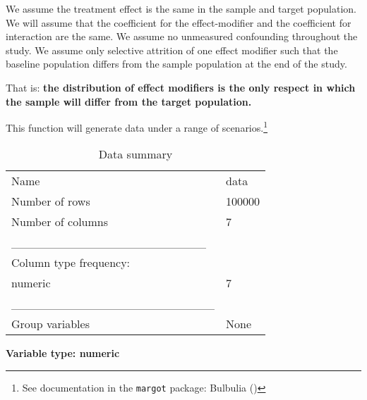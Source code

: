 \documentclass[
  single column]{article}
\begin{document}
We assume the treatment effect is the same in the sample and target
population. We will assume that the coefficient for the effect-modifier
and the coefficient for interaction are the same. We assume no
unmeasured confounding throughout the study. We assume only selective
attrition of one effect modifier such that the baseline population
differs from the sample population at the end of the study.

That is: \textbf{the distribution of effect modifiers is the only
respect in which the sample will differ from the target population.}

This function will generate data under a range of scenarios.\footnote{See
  documentation in the \texttt{margot} package: Bulbulia
  ()}

\begin{longtable}[]{@{}ll@{}}
\caption{Data summary}\tabularnewline
\toprule\noalign{}
\endfirsthead
\endhead
\bottomrule\noalign{}
\endlastfoot
Name & data \\
Number of rows & 100000 \\
Number of columns & 7 \\
\_\_\_\_\_\_\_\_\_\_\_\_\_\_\_\_\_\_\_\_\_\_\_ & \\
Column type frequency: & \\
numeric & 7 \\
\_\_\_\_\_\_\_\_\_\_\_\_\_\_\_\_\_\_\_\_\_\_\_\_ & \\
Group variables & None \\
\end{longtable}

\textbf{Variable type: numeric}
\end{document}

